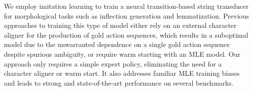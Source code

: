 We employ imitation learning to train a neural transition-based string transducer for morphological tasks such as inflection generation and lemmatization. Previous approaches to training this type of model either rely on an external character aligner for the production of gold action sequences, which results in a suboptimal model due to the unwarranted dependence on a single gold action sequence despite spurious ambiguity, or require warm starting with an MLE model. Our approach only requires a simple expert policy, eliminating the need for a character aligner or warm start. It also addresses familiar MLE training biases and leads to strong and state-of-the-art performance on several benchmarks.
